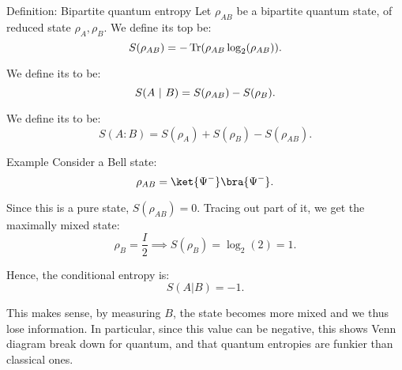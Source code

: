 \documentclass[a4paper]{article}
\begin{document}
\begin{parag}{Definition: Bipartite quantum entropy}
    Let $\rho_{AB}$ be a bipartite quantum state, of reduced state $\rho_A, \rho_B$. We define its  top be:
    \[S\left(\rho_{AB}\right) = -\Tr\left(\rho_{AB} \log_2\left(\rho_{AB}\right)\right).\]

    We define its  to be: 
    \[S\left(A \suchthat B\right) = S\left(\rho_{AB}\right)-  S\left(\rho_B\right).\]
    
    We define its  to be:
    \[S\left(A : B\right) = S\left(\rho_A\right) + S\left(\rho_B\right) - S\left(\rho_{AB}\right).\]
\end{parag}

\begin{parag}{Example}
    Consider a Bell state: 
    \[\rho_{AB} = \ket{\Psi^-}\bra{\Psi^-}.\]

    Since this is a pure state, $S\left(\rho_{AB}\right) = 0$. Tracing out part of it, we get the maximally mixed state: 
    \[\rho_B = \frac{I}{2} \implies S\left(\rho_B\right) = \log_2\left(2\right) = 1.\]

    Hence, the conditional entropy is: 
    \[S\left(A | B\right) = -1.\]

    This makes sense, by measuring $B$, the state becomes more mixed and we thus lose information. In particular, since this value can be negative, this shows Venn diagram break down for quantum, and that quantum entropies are funkier than classical ones.
\end{parag}
\end{document}
